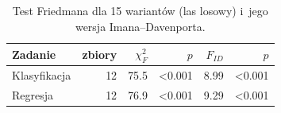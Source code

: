 \begin{table}[!htbp]
\centering\small
\caption{Test Friedmana dla 15 wariantów (las losowy) i~jego wersja Imana--Davenporta.}
\label{tab:friedman}
\begin{tabular}{lrrrrr}
\toprule
\textbf{Zadanie} & \textbf{zbiory} & $\chi^2_F$ & $p$ & $F_{ID}$ & $p$ \\
\midrule
Klasyfikacja & 12 & 75.5 & <0.001 & 8.99 & <0.001 \\
Regresja & 12 & 76.9 & <0.001 & 9.29 & <0.001 \\
\bottomrule
\end{tabular}
\end{table}
